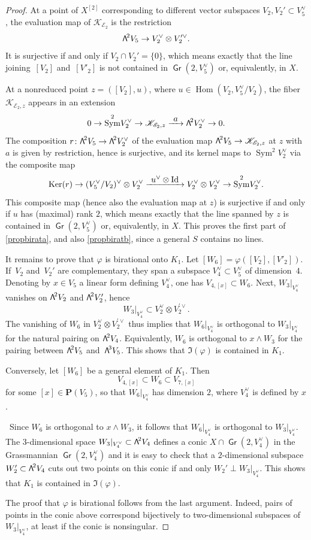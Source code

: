 \documentclass[11pt]{article}
\let\mathcal\mathscr
\newcommand\To[1]{\mathchoice{\xrightarrow{\textstyle\kern4pt#1\kern3pt}}{\stackrel{#1}{\longrightarrow}}{}{}}
\theoremstyle{definition}
\renewcommand\P{{\mathbf P}}\let\PP\P
\newcommand\cE{\mathcal{E}}
\newcommand\cK{\mathcal{K}}
\DeclareMathOperator{\Gr}{\mathsf{Gr}}
\let\phi\varphi
\let\dual\vee
\DeclareMathOperator{\Hom}{Hom}
\DeclareMathOperator{\Id}{Id}
\DeclareMathOperator{\Ker}{Ker}
\DeclareMathOperator{\Sym}{Sym}
\newcommand\bw[1]{{\hbox{\large$\mathsf{\Lambda}$}^{\!#1}}}
\begin{document}
\begin{proof}
At a point of $ X^{[2]}$ corresponding to different vector subspaces $V_2,V_2' \subset V_5^\dual$, the evaluation map of $ \cK_{\cE_2} $ is the restriction
\[
\bw2V_5\to V_2^\dual\otimes V_2^{\prime\dual}.
\]
It is surjective if and only if
$V_2\cap V_2'=\{0\}$, which means exactly that the line joining~$[V_2]$ and~$[V'_2]$
is not contained in $\Gr(2, V_5^\vee)$ or, equivalently, in $X$.

At a nonreduced point $z=([V_2],u)$, where $u\in\Hom (V_2,V_5^\vee/V_2)$, the fiber $\cK_{\cE_2,z}$ appears in an extension
\[
0\to \Sym^2\!V_2^\vee
\to \cK_{\cE_2,z} \To{a} \bw2V_2^\vee\to 0.
\]
The composition $r\colon\bw2V_5\to \bw2V_2^\vee$ of the evaluation map $\bw2V_5\to \cK_{\cE_2,z}$ at $z$ with $a$ is given by restriction, hence is surjective, and its kernel maps to $\Sym^2\!V_2^\vee$ via the composite map
\[
\Ker(r)\to (V_5^\vee/V_2)^\vee\otimes V_2^\vee \To{u^\vee\otimes \Id} V_2^\vee \otimes V_2^\vee
\to \Sym^2\!V_2^\vee.
\]
This composite map (hence also the evaluation map at $z$) is surjective if and only if $u$ has (maximal) rank $2$, which means exactly that the line spanned by $z$ is contained in $\Gr(2, V_5^\vee)$ or, equivalently, in $X$. This proves the first part of \eqref{propbirata}, and also \eqref{propbiratb}, since a general $S$ contains no lines.

It remains to prove that $\phi$ is birational onto $K_1$. Let $[W_6]=\phi([V_2],[V'_2])$.
If~$V_2$ and~$V_2'$ are complementary, they span a subspace $V_4^\dual\subset V_5^\dual$ of dimension~$4$. Denoting by $x\in V_5$ a linear form defining $V_4^\vee$, one has $V_{4,[x]}\subset W_6$. Next, $W_3\vert_{ V_4^\dual}$ vanishes on $\bw2V_2$ and $\bw2{V_2'}$, hence
\[
W_3\vert_{ V_4^\dual}\subset V_2^\dual\otimes V_2^{\prime\dual}.
\]
The vanishing of $W_6$ in $ V_2^\dual\otimes V_2^{\prime\dual}$ thus implies that
$W_{6}\vert_{V_4^\dual}$ is orthogonal to
$W_3\vert_{ V_4^\dual}$ for the natural pairing on $\bw2V_4$. Equivalently, $W_6$ is orthogonal to
$ x\wedge W_3$ for the pairing between
$\bw2V_5$ and~$ \bw3V_5$.
This shows that $\Im (\phi)$ is contained in
$K_1$.

Conversely, let $[W_6]$ be a general element of
$K_1$. Then
\[
V_{4,[x]}\subset W_6\subset V_{7,[x]}
\]
for some $[x]\in \P(V_5)$, so that $W_6\vert_{V_4^\vee}$ has dimension $2$, where $V_4^\vee$ is defined by $x$.

\ Since $W_6 $ is orthogonal to $ x\wedge W_3$, it follows that
$W_{6}\vert_{ V_4^\dual} $ is orthogonal to $ W_3\vert_{ V_4^\dual}$. The $3$-dimensional space $W_3\vert_{ V_4^\dual}\subset \bw2V_4$ defines
a conic $X\cap \Gr(2,V_4^\dual)$ in the Grassmannian $\Gr(2,V_4^\dual)$ and it is easy to check that
a $2$-dimensional subspace $W_2' \subset \bw2V_4$ cuts out two points on this conic
if and only $W_2'\perp W_3\vert_{ V_4^\dual}$. This shows that $K_1$ is contained in $\Im(\phi)$.

The proof that $\phi$ is birational follows from the last argument. Indeed, pairs of points in the conic above
correspond bijectively to two-dimensional subspaces of $W_3\vert_{ V_4^\dual}$, at least if the conic is nonsingular.
\end{proof}
\end{document}
